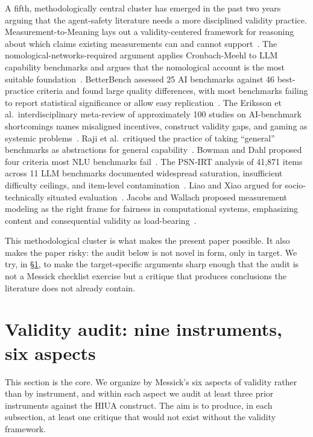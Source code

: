 \documentclass[11pt]{article}
\begin{document}
A fifth, methodologically central cluster has emerged in the past two years arguing that the agent-safety literature needs a more disciplined validity practice. Measurement-to-Meaning lays out a validity-centered framework for reasoning about which claims existing measurements can and cannot support~\cite{m2m2025}. The nomological-networks-required argument applies Cronbach-Meehl to LLM capability benchmarks and argues that the nomological account is the most suitable foundation~\cite{nomologicalnetworks2026}. BetterBench assessed 25 AI benchmarks against 46 best-practice criteria and found large quality differences, with most benchmarks failing to report statistical significance or allow easy replication~\cite{betterbench2024}. The Eriksson et al.\ interdisciplinary meta-review of approximately 100 studies on AI-benchmark shortcomings names misaligned incentives, construct validity gaps, and gaming as systemic problems~\cite{canwetrust2025}. Raji et al.\ critiqued the practice of taking ``general'' benchmarks as abstractions for general capability~\cite{raji2021}. Bowman and Dahl proposed four criteria most NLU benchmarks fail~\cite{bowmandahl2021}. The PSN-IRT analysis of 41{,}871 items across 11 LLM benchmarks documented widespread saturation, insufficient difficulty ceilings, and item-level contamination~\cite{lostinbench2025}. Liao and Xiao argued for socio-technically situated evaluation~\cite{liaoxiao2023}. Jacobs and Wallach proposed measurement modeling as the right frame for fairness in computational systems, emphasizing content and consequential validity as load-bearing~\cite{jacobswallach2021}.

This methodological cluster is what makes the present paper possible. It also makes the paper risky: the audit below is not novel in form, only in target. We try, in \S\ref{sec:audit}, to make the target-specific arguments sharp enough that the audit is not a Messick checklist exercise but a critique that produces conclusions the literature does not already contain.

\section{Validity audit: nine instruments, six aspects}
\label{sec:audit}

This section is the core. We organize by Messick's six aspects of validity rather than by instrument, and within each aspect we audit at least three prior instruments against the HIUA construct. The aim is to produce, in each subsection, at least one critique that would not exist without the validity framework.
\end{document}
